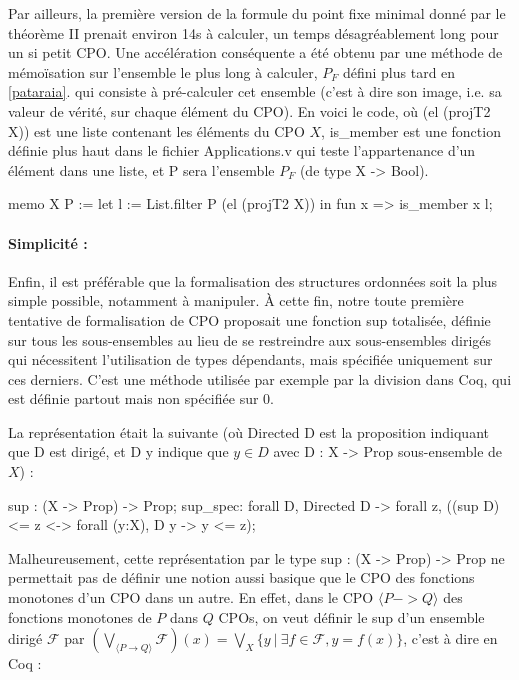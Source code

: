 \documentclass{article}
\newcommand\code[1]{{\fontfamily{lmtt}\selectfont #1}}
\theoremstyle{definition}
\begin{document}
Par ailleurs, la première version de la formule du point fixe minimal donné par le théorème II prenait environ 14s à calculer, un temps désagréablement long pour un si petit CPO. Une accélération conséquente a été obtenu par une méthode de mémoïsation sur l'ensemble le plus long à calculer, $P_F$ défini plus tard en \ref{pataraia}.
qui consiste à pré-calculer cet ensemble (c'est à dire son image, i.e. sa valeur de vérité, sur chaque élément du CPO). En voici le code, où \code{(el (projT2 X))} est une liste contenant les éléments du CPO $X$, \code{is\_member} est une fonction définie plus haut dans le fichier \code{Applications.v} qui teste l'appartenance d'un élément dans une liste, et \code{P} sera l'ensemble $P_F$ (de type \code{X -> Bool}).

\begin{coq}
	memo X P := let l := List.filter P (el (projT2 X)) in
					fun x => is_member x l;
\end{coq}

\paragraph{Simplicité : \\}
\label{simplicite}

Enfin, il est préférable que la formalisation des structures ordonnées soit la plus simple possible, notamment à manipuler. À cette fin, notre toute première tentative de formalisation de CPO proposait une fonction sup totalisée, définie sur tous les sous-ensembles au lieu de se restreindre aux sous-ensembles dirigés qui nécessitent l'utilisation de types dépendants, mais spécifiée uniquement sur ces derniers. C'est une méthode utilisée par exemple par la division dans Coq, qui est définie partout mais non spécifiée sur $0$. 

La représentation était la suivante (où \code{Directed D} est la proposition indiquant que D est dirigé, et \code{D y} indique que $y \in D$ avec \code{D : X -> Prop} sous-ensemble de $X$) :

\begin{coq}
sup : (X -> Prop) -> Prop;
sup_spec: forall D, Directed D -> forall z, 
			 ((sup D) <= z <-> forall (y:X), D y -> y <= z);
\end{coq}

Malheureusement, cette représentation par le type \code{sup : (X -> Prop) -> Prop} ne permettait pas de définir une notion aussi basique que le CPO des fonctions monotones d'un CPO dans un autre. En effet, dans le CPO $\langle P -> Q \rangle$ des fonctions monotones de $P$ dans $Q$ CPOs, on veut définir le sup d'un ensemble dirigé $\mathcal{F}$ par $(\bigvee_{\langle P \rightarrow Q \rangle} \mathcal{F})(x) = \bigvee_{X} \{y ~ | ~ \exists f \in \mathcal{F}, y = f(x)\}$, c'est à dire en Coq :
\end{document}
